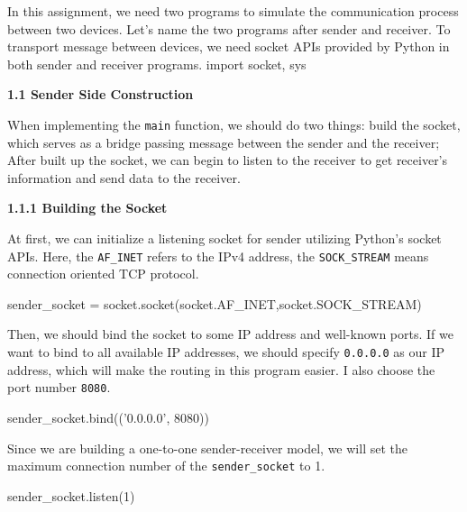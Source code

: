 \documentclass{article}%
\newenvironment{code}%
   {\snugshade\verbatim}%
   {\endverbatim\endsnugshade}
\begin{document}
\begin{Large}

In this assignment, we need two programs to simulate the communication process between two devices. Let's name the two programs after sender and receiver. To transport message between devices, we need socket APIs provided by Python in both sender and receiver programs.
\begin{code}
    import socket, sys
\end{code}
\begin{flushleft}
\begin{LARGE}
\textbf{1.1 Sender Side Construction}
\end{LARGE}
\end{flushleft}

When implementing the \texttt{main} function, we should do two things: build the socket, which serves as a bridge passing message between the sender and the receiver; After built up the socket, we can begin to listen to the receiver to get receiver's information and send data to the receiver.

\begin{flushleft}
\textbf{1.1.1 Building the Socket}
\end{flushleft}

At first, we can initialize a listening socket for sender utilizing Python's socket APIs. Here, the \texttt{AF\_INET} refers to the IPv4 address, the \texttt{SOCK\_STREAM} means connection oriented TCP protocol. 

\begin{code}
    sender_socket = socket.socket(socket.AF_INET,socket.SOCK_STREAM)
\end{code}

Then, we should bind the socket to some IP address and well-known ports. If we want to bind to all available IP addresses, we should specify \texttt{0.0.0.0} as our IP address, which will make the routing in this program easier. I also choose the port number \texttt{8080}.

\begin{code}
    sender_socket.bind(('0.0.0.0', 8080))
\end{code}

Since we are building a one-to-one sender-receiver model, we will set the maximum connection number of the \texttt{sender\_socket} to 1.

\begin{code}
    sender_socket.listen(1)
\end{code}


\end{Large}
\end{document}

